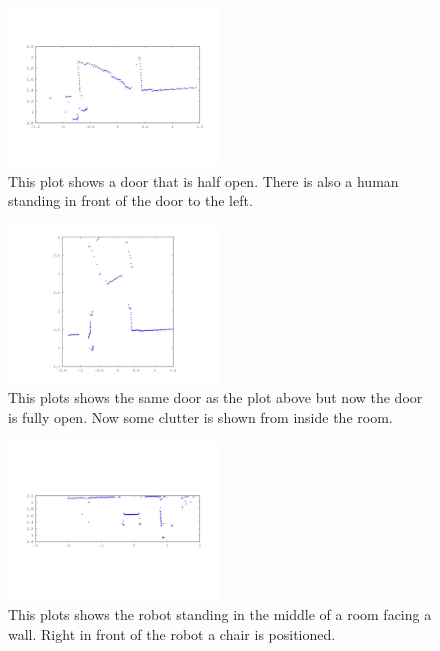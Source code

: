 \documentclass[a4paper, 10pt, conference]{ieeeconf}      %
\begin{document}
\begin{figure}
\centering
\includegraphics[width=0.5\textwidth]{presimg/doorhalf.jpg}
\caption{This plot shows a door that is half open. There is also a human standing in front of the door to the left.}
\label{doorhalf}
\end{figure}

\begin{figure}
\centering
\includegraphics[width=0.5\textwidth]{presimg/doorfull.jpg}
\caption{This plots shows the same door as the plot above but now the door is fully open. Now some clutter is shown from inside the room.}
\label{doorfull}
\end{figure}

\begin{figure}
\centering
\includegraphics[width=0.5\textwidth]{presimg/chair.jpg}
\caption{This plots shows the robot standing in the middle of a room facing a wall. Right in front of the robot a chair is positioned.}
\label{chair}
\end{figure}
\end{document}
